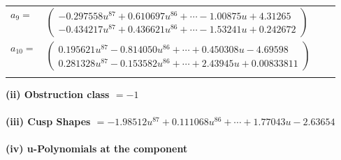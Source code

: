 \documentclass[1p]{elsarticle_modified}
\theoremstyle{definition}
\begin{document}
\begin{tabular}{m{7pt} m{180pt} m{7pt} m{180pt} }
\flushright $a_{9}=$&$\begin{pmatrix}-0.297558 u^{87}+0.610697 u^{86}+\cdots-1.00875 u+4.31265\\-0.434217 u^{87}+0.436621 u^{86}+\cdots-1.53241 u+0.242672\end{pmatrix}$ \\
\flushright $a_{10}=$&$\begin{pmatrix}0.195621 u^{87}-0.814050 u^{86}+\cdots+0.450308 u-4.69598\\0.281328 u^{87}-0.153582 u^{86}+\cdots+2.43945 u+0.00833811\end{pmatrix}$\\&\end{tabular}
\flushleft \textbf{(ii) Obstruction class $= -1$}\\~\\
\flushleft \textbf{(iii) Cusp Shapes $= -1.98512 u^{87}+0.111068 u^{86}+\cdots+1.77043 u-2.63654$}\\~\\
\newpage\renewcommand{\arraystretch}{1}
\flushleft \textbf{(iv) u-Polynomials at the component}\newline \\
\end{document}
